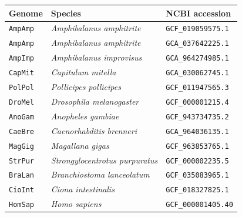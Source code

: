 \begin{table}[ht]
    \centering
    \begin{tabular}{lll}
        \toprule
            Genome & Species & NCBI accession \\
        \midrule
            \texttt{AmpAmp} & \textit{Amphibalanus amphitrite}       & \texttt{GCF\_019059575.1} \\
            \texttt{AmpAmp} & \textit{Amphibalanus amphitrite}       & \texttt{GCA\_037642225.1} \\
            \texttt{AmpImp} & \textit{Amphibalanus improvisus}       & \texttt{GCA\_964274985.1} \\
            \texttt{CapMit} & \textit{Capitulum mitella}             & \texttt{GCA\_030062745.1} \\
            \texttt{PolPol} & \textit{Pollicipes pollicipes}         & \texttt{GCF\_011947565.3} \\
            \texttt{DroMel} & \textit{Drosophila melanogaster}       & \texttt{GCF\_000001215.4} \\
            \texttt{AnoGam} & \textit{Anopheles gambiae}             & \texttt{GCF\_943734735.2} \\
            \texttt{CaeBre} & \textit{Caenorhabditis brenneri}       & \texttt{GCA\_964036135.1} \\
            \texttt{MagGig} & \textit{Magallana gigas}               & \texttt{GCF\_963853765.1} \\
            \texttt{StrPur} & \textit{Strongylocentrotus purpuratus} & \texttt{GCF\_000002235.5} \\
            \texttt{BraLan} & \textit{Branchiostoma lanceolatum}     & \texttt{GCF\_035083965.1} \\
            \texttt{CioInt} & \textit{Ciona intestinalis}            & \texttt{GCF\_018327825.1} \\
            \texttt{HomSap} & \textit{Homo sapiens}                  & \texttt{GCF\_000001405.40} \\
        \bottomrule
    \end{tabular}
    \label{tab:sup_ncbi_genomes}
\end{table}


